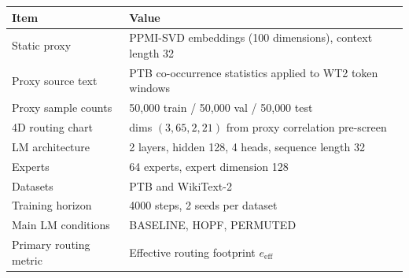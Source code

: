 \begin{tabular}{ll}
\toprule
Item & Value \\
\midrule
Static proxy & PPMI-SVD embeddings (100 dimensions), context length 32 \\
Proxy source text & PTB co-occurrence statistics applied to WT2 token windows \\
Proxy sample counts & 50{,}000 train / 50{,}000 val / 50{,}000 test \\
4D routing chart & dims $(3,65,2,21)$ from proxy correlation pre-screen \\
LM architecture & 2 layers, hidden 128, 4 heads, sequence length 32 \\
Experts & 64 experts, expert dimension 128 \\
Datasets & PTB and WikiText-2 \\
Training horizon & 4000 steps, 2 seeds per dataset \\
Main LM conditions & BASELINE, HOPF, PERMUTED \\
Primary routing metric & Effective routing footprint $e_{\mathrm{eff}}$ \\
\bottomrule
\end{tabular}

